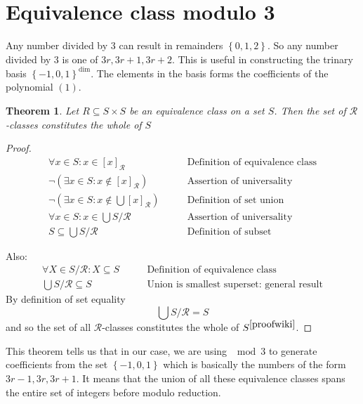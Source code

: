 \documentclass[cryptography,article,submit,moreauthors,pdftex]{Definitions/mdpi}
\newtheorem*{theorem}{Theorem}
\begin{document}
\section{Equivalence class modulo 3}
Any number divided by 3 can result in remainders $\left\{0,1,2\right\}$. So any number divided by 3 is one of $3r,3r+1,3r+2$. This is useful in constructing the trinary basis $\left\{-1,0,1\right\}^{\text{dim}}$. The elements in the basis forms the coefficients of the polynomial $(1)$.

\newpage
\begin{theorem}
Let $R\subseteq S\times S$ be an equivalence class on a set $S$. Then the set of $\mathcal{R}$-classes constitutes the whole of $S$
\end{theorem}

\begin{proof}
    \notag
    \begin{align}
        \forall x\in S:x\in[x]_{\mathcal{R}}&\qquad\text{Definition of equivalence class}\\
        \lnot\left(\exists x\in S:x\notin [x]_{\mathcal{R}}\right)&\qquad\text{Assertion of universality}\\
        \lnot\left(\exists x\in S: x\notin\bigcup[x]_{\mathcal{R}}\right)&\qquad\text{Definition of set union}\\
        \forall x\in S:x\in\bigcup S/\mathcal{R}&\qquad\text{Assertion of universality}\\
        S\subseteq\bigcup S/\mathcal{R}&\qquad\text{Definition of subset}
    \end{align}
    
    Also:
    \begin{align}
        \forall X\in S/\mathcal{R}:X\subseteq S&\qquad\text{Definition of equivalence class}\\
        \bigcup S/\mathcal{R}\subseteq S&\qquad\text{Union is smallest superset: general result}
    \end{align}
    By definition of set equality
    $$\bigcup S/\mathcal{R}=S$$
    and so the set of all $\mathcal{R}$-classes constitutes the whole of $S^{\cite{proofwiki}}$.
\end{proof}

\begin{flushleft}
    This theorem tells us that in our case, we are using $\mod 3$ to generate coefficients from the set $\left\{-1,0,1\right\}$ which is basically the numbers of the form $3r-1,3r,3r+1$. It means that the union of all these equivalence classes spans the entire set of integers before modulo reduction.
\end{flushleft}
 
\end{document}
